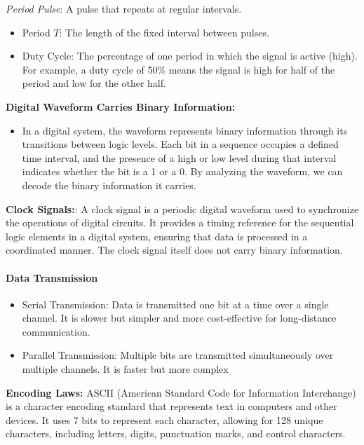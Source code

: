 \documentclass[
  a4paper,
]{article}
\providecommand{\tightlist}{%
  \setlength{\itemsep}{0pt}\setlength{\parskip}{0pt}}
\begin{document}
\emph{Period Pulse}: A pulse that repeats at regular intervals.

\begin{itemize}
\tightlist
\item
  Period \(T\): The length of the fixed interval between pulses.
\item
  Duty Cycle: The percentage of one period in which the signal is active
  (high). For example, a duty cycle of 50\% means the signal is high for
  half of the period and low for the other half.
\end{itemize}

\textbf{Digital Waveform Carries Binary Information:}

\begin{itemize}
\tightlist
\item
  In a digital system, the waveform represents binary information
  through its transitions between logic levels. Each bit in a sequence
  occupies a defined time interval, and the presence of a high or low
  level during that interval indicates whether the bit is a 1 or a 0. By
  analyzing the waveform, we can decode the binary information it
  carries.
\end{itemize}

\textbf{Clock Signals:}: A clock signal is a periodic digital waveform
used to synchronize the operations of digital circuits. It provides a
timing reference for the sequential logic elements in a digital system,
ensuring that data is processed in a coordinated manner. The clock
signal itself does not carry binary information.

\paragraph{Data Transmission}\label{data-transmission}

\begin{itemize}
\tightlist
\item
  Serial Transmission: Data is transmitted one bit at a time over a
  single channel. It is slower but simpler and more cost-effective for
  long-distance communication.
\item
  Parallel Transmission: Multiple bits are transmitted simultaneously
  over multiple channels. It is faster but more complex
\end{itemize}

\textbf{Encoding Laws:} ASCII (American Standard Code for Information
Interchange) is a character encoding standard that represents text in
computers and other devices. It uses 7 bits to represent each character,
allowing for 128 unique characters, including letters, digits,
punctuation marks, and control characters.
\end{document}
